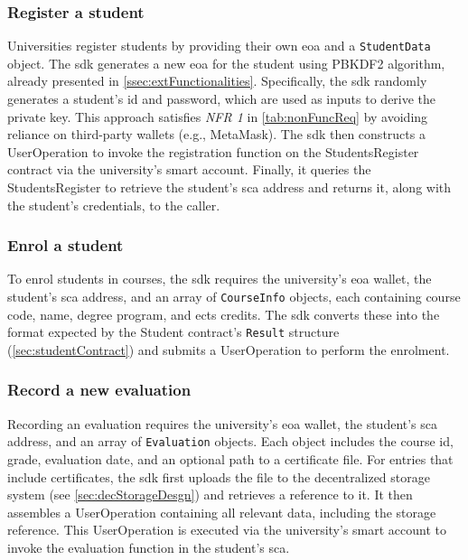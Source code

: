 \subsubsection{Register a student}
Universities register students by providing their own \acrshort{eoa} and a \texttt{StudentData} object. The \acrshort{sdk} generates a new \acrshort{eoa} for the student using PBKDF2 algorithm, already presented in \cref{ssec:extFunctionalities}. Specifically, the \acrshort{sdk} randomly generates a student's \gls{id} and password, which are used as inputs to derive the private key. This approach satisfies \textit{NFR 1} in \cref{tab:nonFuncReq} by avoiding reliance on third-party wallets (e.g., MetaMask). The \acrshort{sdk} then constructs a UserOperation to invoke the registration function on the StudentsRegister contract via the university's smart account. Finally, it queries the StudentsRegister to retrieve the student's \acrshort{sca} address and returns it, along with the student's credentials, to the caller.

\subsubsection{Enrol a student}
To enrol students in courses, the \acrshort{sdk} requires the university's \acrshort{eoa} wallet, the student's \acrshort{sca} address, and an array of \texttt{CourseInfo} objects, each containing course code, name, degree program, and \acrshort{ects} credits. The \acrshort{sdk} converts these into the format expected by the Student contract's \texttt{Result} structure (\cref{sec:studentContract}) and submits a UserOperation to perform the enrolment.

\subsubsection{Record a new evaluation}
Recording an evaluation requires the university’s \acrshort{eoa} wallet, the student’s \acrshort{sca} address, and an array of \texttt{Evaluation} objects. Each object includes the course \gls{id}, grade, evaluation date, and an optional path to a certificate file. For entries that include certificates, the \acrshort{sdk} first uploads the file to the decentralized storage system (see \cref{sec:decStorageDesgn}) and retrieves a reference to it. It then assembles a UserOperation containing all relevant data, including the storage reference. This UserOperation is executed via the university's smart account to invoke the evaluation function in the student's \acrshort{sca}.

